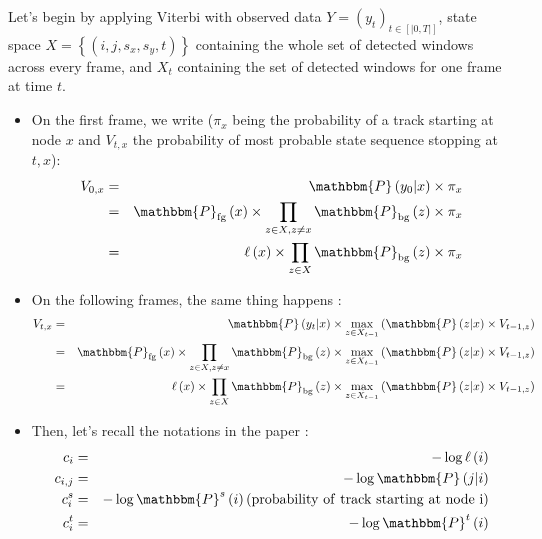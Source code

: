 \documentclass{letter}
\newcommand{\tmop}[1]{\ensuremath{\operatorname{#1}}}
\begin{document}
Let's begin by applying Viterbi with observed data $Y = \left( y_t \right)_{t
\in \left[ \left| 0, T \right| \right]}$, state space $X = \left\{ \left( i,
j, s_x, s_y, t \right) \right\}$ containing the whole set of detected windows
across every frame, and $X_t$ containing the set of detected windows for one
frame at time $t$.
\begin{itemize}
  \item On the first frame, we write ($\pi_x$ being the probability of a track
  starting at node $x$ and $V_{t, x}$ the probability of most probable state
  sequence stopping at $t, x$):
  \begin{eqnarray*}
    V_{0, x} & = & \mathbbm{P} \left( y_0 |x \right) \times \pi_x\\
    & = & \mathbbm{P}_{\tmop{fg}} \left( x \right) \times \prod_{z \in X, z
    \neq x} \mathbbm{P}_{\tmop{bg}} \left( z \right) \times \pi_x\\
    & = & \ell \left( x \right) \times \prod_{z \in X}
    \mathbbm{P}_{\tmop{bg}} \left( z \right) \times \pi_x
  \end{eqnarray*}
  \item On the following frames, the same thing happens :
  \begin{eqnarray*}
    V_{t, x} & = & \mathbbm{P} \left( y_t |x \right) \times \max_{z \in X_{t -
    1}} \left( \mathbbm{P} \left( z|x \right) \times V_{t - 1, z} \right)\\
    & = & \mathbbm{P}_{\tmop{fg}} \left( x \right) \times \prod_{z \in X, z
    \neq x} \mathbbm{P}_{\tmop{bg}} \left( z \right) \times \max_{z \in X_{t -
    1}} \left( \mathbbm{P} \left( z|x \right) \times V_{t - 1, z} \right)\\
    & = & \ell \left( x \right) \times \prod_{z \in X}
    \mathbbm{P}_{\tmop{bg}} \left( z \right) \times \max_{z \in X_{t - 1}}
    \left( \mathbbm{P} \left( z|x \right) \times V_{t - 1, z} \right)
  \end{eqnarray*}
  \item Then, let's recall the notations in the paper :
  \begin{eqnarray*}
    c_i & = & - \log \ell \left( i \right)\\
    c_{i, j} & = & - \log \mathbbm{P} \left( j|i \right)\\
    c_i^s & = & - \log \mathbbm{P}^s \left( i \right)
    \text{(\tmop{probability} \tmop{of} \tmop{track} \tmop{starting} \tmop{at}
    \tmop{node} i)}\\
    c_i^t & = & - \log \mathbbm{P}^t \left( i \right)

\end{eqnarray*}
\end{itemize}
\end{document}
